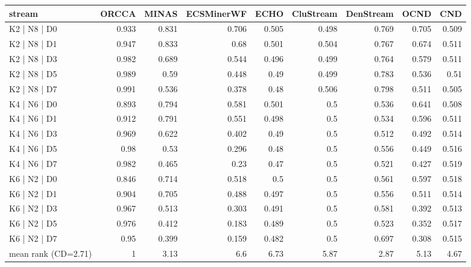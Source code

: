 \begin{tabular}{lrrrrrrrr}
\hline
 stream              &   ORCCA &   MINAS &   ECSMinerWF &   ECHO &   CluStream &   DenStream &   OCND &   CND \\
\hline
 K2 | N8 | D0        &   0.933 &   0.831 &        0.706 &  0.505 &       0.498 &       0.769 &  0.705 & 0.509 \\
 K2 | N8 | D1        &   0.947 &   0.833 &        0.68  &  0.501 &       0.504 &       0.767 &  0.674 & 0.511 \\
 K2 | N8 | D3        &   0.982 &   0.689 &        0.544 &  0.496 &       0.499 &       0.764 &  0.579 & 0.511 \\
 K2 | N8 | D5        &   0.989 &   0.59  &        0.448 &  0.49  &       0.499 &       0.783 &  0.536 & 0.51  \\
 K2 | N8 | D7        &   0.991 &   0.536 &        0.378 &  0.48  &       0.506 &       0.798 &  0.511 & 0.505 \\
 K4 | N6 | D0        &   0.893 &   0.794 &        0.581 &  0.501 &       0.5   &       0.536 &  0.641 & 0.508 \\
 K4 | N6 | D1        &   0.912 &   0.791 &        0.551 &  0.498 &       0.5   &       0.534 &  0.596 & 0.511 \\
 K4 | N6 | D3        &   0.969 &   0.622 &        0.402 &  0.49  &       0.5   &       0.512 &  0.492 & 0.514 \\
 K4 | N6 | D5        &   0.98  &   0.53  &        0.296 &  0.48  &       0.5   &       0.556 &  0.449 & 0.516 \\
 K4 | N6 | D7        &   0.982 &   0.465 &        0.23  &  0.47  &       0.5   &       0.521 &  0.427 & 0.519 \\
 K6 | N2 | D0        &   0.846 &   0.714 &        0.518 &  0.5   &       0.5   &       0.561 &  0.597 & 0.518 \\
 K6 | N2 | D1        &   0.904 &   0.705 &        0.488 &  0.497 &       0.5   &       0.556 &  0.511 & 0.514 \\
 K6 | N2 | D3        &   0.967 &   0.513 &        0.303 &  0.491 &       0.5   &       0.581 &  0.392 & 0.513 \\
 K6 | N2 | D5        &   0.976 &   0.412 &        0.183 &  0.489 &       0.5   &       0.523 &  0.352 & 0.517 \\
 K6 | N2 | D7        &   0.95  &   0.399 &        0.159 &  0.482 &       0.5   &       0.697 &  0.308 & 0.515 \\
 mean rank (CD=2.71) &   1     &   3.13  &        6.6   &  6.73  &       5.87  &       2.87  &  5.13  & 4.67  \\
\hline
\end{tabular}